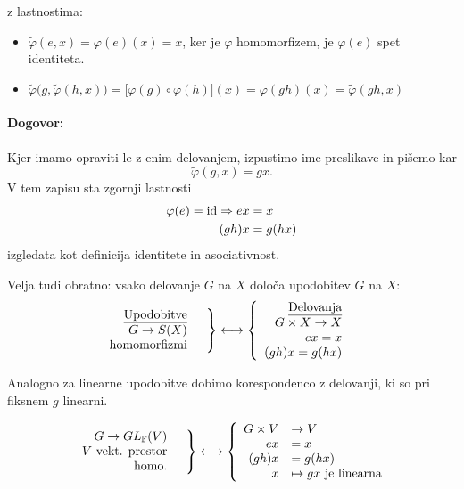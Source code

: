 \ni z lastnostima:
\begin{itemize}
	\item{$\tilde{\varphi}(e, x) = \varphi(e) (x) = x$, ker je $\varphi$ homomorfizem, je $\varphi(e)$ spet identiteta.}
	\item{$\tilde{\varphi}\big(g, \tilde{\varphi}(h,x)\big) = \big[\varphi(g) \circ \varphi(h)\big] (x) = \varphi (gh)(x) = \tilde{\varphi}(gh,x)$}
\end{itemize}

\paragraph{Dogovor:} Kjer imamo opraviti le z enim delovanjem, izpustimo ime preslikave in pi\v semo kar
\[
	\tilde{\varphi}(g,x) = gx.
\]
V tem zapisu sta zgornji lastnosti
\begin{align*}
	\varphi(e) = \operatorname{id} \Rightarrow ex &= x \\
		(gh)x &= g(hx)
\end{align*}
\ni izgledata kot definicija identitete in asociativnost.

\ni Velja tudi obratno: vsako delovanje $G$ na $X$ dolo\v ca upodobitev $G$ na $X$:
\begin{align*}
	\left.
	\begin{array}{rl}
		\text{\underline{Upodobitve}} & \\
		G \to S(X) & \\
		\text{homomorfizmi} &
	\end{array} \right\} \longleftrightarrow
	\left\{
	\begin{array}{rl}
		\text{\underline{Delovanja}} & \\
		G \times X \to X & \\
		ex = x &\\
		(gh)x = g(hx)
	\end{array}\right.
\end{align*}

\ni Analogno za linearne upodobitve dobimo korespondenco z delovanji, ki so pri fiksnem $g$ linearni.

\begin{align*}
	\left.
	\begin{array}{rl}
		G \to GL_{\mathbb{F}}(V) & \\
		\text{$V$ vekt. prostor} \\
		\text{homo.} &
	\end{array} \right\} \longleftrightarrow
	\left\{
	\begin{array}{rl}
		G \times V &\to V \\
		ex &= x \\
		(gh)x &= g(hx) \\
		x &\mapsto gx\ \text{je linearna}
	\end{array}\right.
\end{align*}

